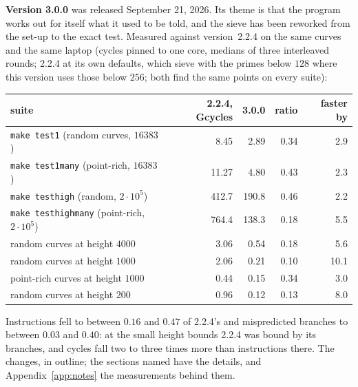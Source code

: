 \documentclass[12pt,a4paper,oneside]{amsart}
\begin{document}
\textbf{Version 3.0.0} was released September 21, 2026. Its theme is that
the program works out for itself what it used to be told, and the sieve has
been reworked from the set-up to the exact test. Measured against
version~2.2.4 on the same curves and the same laptop (cycles pinned to one
core, medians of three interleaved rounds; 2.2.4 at its own defaults, which
sieve with the primes below $128$ where this version uses those below $256$;
both find the same points on every suite):
\begin{center}
\begin{tabular}{lrrrr}
suite & 2.2.4, Gcycles & 3.0.0 & ratio & faster by \\
\hline
\texttt{make test1} (random curves, $16383$)      &   8.45 &   2.89 & 0.34 &  2.9 \\
\texttt{make test1many} (point-rich, $16383$)     &  11.27 &   4.80 & 0.43 &  2.3 \\
\texttt{make testhigh} (random, $2\cdot 10^5$)    & 412.7  & 190.8  & 0.46 &  2.2 \\
\texttt{make testhighmany} (point-rich, $2\cdot 10^5$) & 764.4 & 138.3 & 0.18 & 5.5 \\
random curves at height $4000$                  &   3.06 &   0.54 & 0.18 &  5.6 \\
random curves at height $1000$                  &   2.06 &   0.21 & 0.10 & 10.1 \\
point-rich curves at height $1000$              &   0.44 &   0.15 & 0.34 &  3.0 \\
random curves at height $200$                   &   0.96 &   0.12 & 0.13 &  8.0 \\
\end{tabular}
\end{center}
Instructions fell to between $0.16$ and $0.47$ of 2.2.4's and mispredicted
branches to between $0.03$ and $0.40$: at the small height bounds 2.2.4 was
bound by its branches, and cycles fall two to three times more than
instructions there. The changes, in outline; the sections named have the
details, and Appendix~\ref{app:notes} the measurements behind them.
\end{document}
